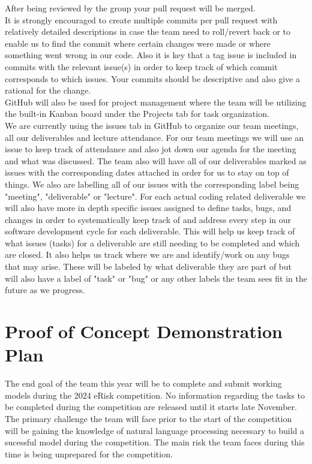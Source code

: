 \documentclass{article}
\begin{document}
After being reviewed by the group your pull request will be merged.\\

It is strongly encouraged to create multiple commits per pull request with relatively detailed descriptions in case the team need to roll/revert back or to enable us to find the commit where certain changes were made or where something went wrong in our code. Also it is key that a tag issue is included in commits with the relevant issue(s) in order to keep track of which commit corresponds to which issues. Your commits should be descriptive and also give a rational for the change.\\

GitHub will also be used for project management where the team will be utilizing the built-in Kanban board under the Projects tab for task organization. \\

We are currently using the issues tab in GitHub to organize our team meetings, all our deliverables and lecture attendance. For our team meetings we will use an issue to keep track of attendance and also jot down our agenda for the meeting and what was discussed. The team also will have all of our deliverables marked as issues with the corresponding dates attached in order for us to stay on top of things. We also are labelling all of our issues with the corresponding label being "meeting", "deliverable" or "lecture". For each actual coding related deliverable we will also have more in depth specific issues assigned to define tasks, bugs, and changes in order to systematically keep track of and address every step in our software development cycle for each deliverable. This will help us keep track of what issues (tasks) for a deliverable are still needing to be completed and which are closed. It also helps us track where we are and identify/work on any bugs that may arise. These will be labeled by what deliverable they are part of but will also have a label of "task" or "bug" or any other labels the team sees fit in the future as we progress.

\section{Proof of Concept Demonstration Plan}

The end goal of the team this year will be to complete and submit working models during the 2024 eRisk competition. No information regarding the tasks to be completed during the competition are released until it starts late November. The primary challenge the team will face prior to the start of the competition will be gaining the knowledge of natural language processing necessary to build a sucessful model during the competition. The main risk the team faces during this time is being unprepared for the competition.
\end{document}
